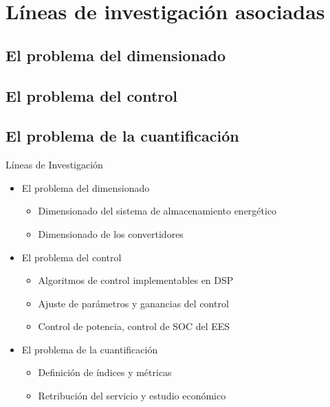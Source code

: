\section[Líneas de investigación asociadas]{Líneas de investigación asociadas}
%
%
\subsection[]{El problema del dimensionado}
\subsection[]{El problema del control}
\subsection[]{El problema de la cuantificación}
%
%
%
%
\begin{frame}{Líneas de Investigación}
\begin{itemize}
    \item El problema del dimensionado
    \begin{itemize}
        \item Dimensionado del sistema de almacenamiento energético \\[1ex]
        \item Dimensionado de los convertidores \\[2ex]
    \end{itemize}
    \item El problema del control
    \begin{itemize}
        \item Algoritmos de control implementables en DSP \\[1ex]
        \item Ajuste de parámetros y ganancias del control \\[1ex]
        \item Control de potencia, control de SOC del EES \\[2ex]
    \end{itemize}{}
    \item El problema de la cuantificación
    \begin{itemize}
        \item Definición de índices y métricas \\[1ex]
        \item Retribución del servicio y estudio económico \\[1ex]
    \end{itemize}
\end{itemize}
\end{frame}
